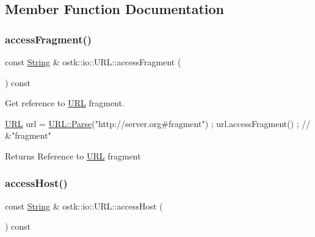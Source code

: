 \subsection{Member Function Documentation}
\mbox{\label{classostk_1_1io_1_1_u_r_l_ad73236e116c77a5c92c518c8f23649ea}} 
\subsubsection{\texorpdfstring{access\+Fragment()}{accessFragment()}}
{\footnotesize\ttfamily const \hyperlink{namespaceostk_1_1io_a95d49b120613a7610cb1b4f03b1116b6}{String} \& ostk\+::io\+::\+U\+R\+L\+::access\+Fragment (\begin{DoxyParamCaption}{ }\end{DoxyParamCaption}) const}



Get reference to \hyperlink{classostk_1_1io_1_1_u_r_l}{U\+RL} fragment. 


\begin{DoxyCode}
\hyperlink{classostk_1_1io_1_1_u_r_l_a2537e046cef4ac966cc295abb81279c2}{URL} url = \hyperlink{classostk_1_1io_1_1_u_r_l_a1cd7216bb1079f62386a218ba510958d}{URL::Parse}(\textcolor{stringliteral}{"http://server.org#fragment"}) ;
url.accessFragment() ; \textcolor{comment}{// &"fragment"}
\end{DoxyCode}


\begin{DoxyReturn}{Returns}
Reference to \hyperlink{classostk_1_1io_1_1_u_r_l}{U\+RL} fragment 
\end{DoxyReturn}
\mbox{\label{classostk_1_1io_1_1_u_r_l_a2faf73b2ba1fd2224a6f53a1883d8340}} 
\subsubsection{\texorpdfstring{access\+Host()}{accessHost()}}
{\footnotesize\ttfamily const \hyperlink{namespaceostk_1_1io_a95d49b120613a7610cb1b4f03b1116b6}{String} \& ostk\+::io\+::\+U\+R\+L\+::access\+Host (\begin{DoxyParamCaption}{ }\end{DoxyParamCaption}) const}



